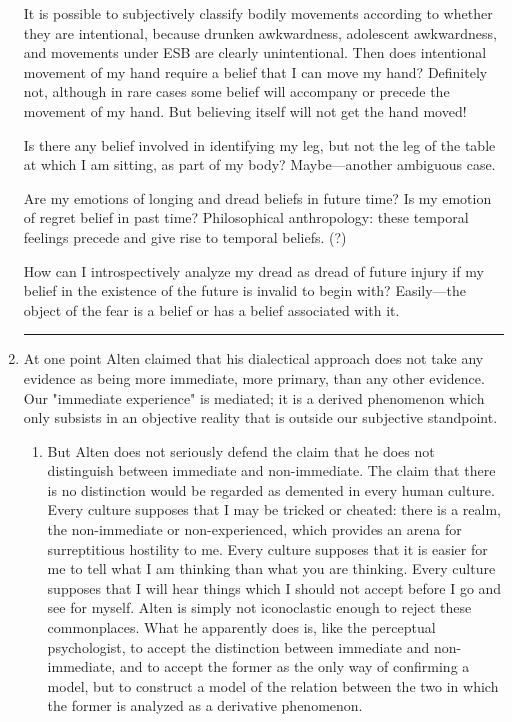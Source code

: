 \documentclass[10pt,twoside]{memoir}
\newcommand{\gap}{\plainbreak{2}}
\begin{document}
\begin{enumerate}
It is possible to subjectively classify bodily movements according to 
whether they are intentional, because drunken awkwardness, adolescent 
awkwardness, and movements under ESB are clearly unintentional. Then 
does intentional movement of my hand require a belief that I can move my 
hand? Definitely not, although in rare cases some belief will accompany or 
precede the movement of my hand. But believing itself will not get the hand 
moved! 

Is there any belief involved in identifying my leg, but not the leg of the 
table at which I am sitting, as part of my body? Maybe---another ambiguous 
case.

Are my emotions of longing and dread beliefs in future time? Is my 
emotion of regret belief in past time? Philosophical anthropology: these 
temporal feelings precede and give rise to temporal beliefs. (?) 

How can I introspectively analyze my dread as dread of future injury if 
my belief in the existence of the future is invalid to begin with? Easily---the 
object of the fear is a belief or has a belief associated with it. 

\gap

\item At one point Alten claimed that his dialectical approach does not 
take any evidence as being more immediate, more primary, than any other 
evidence. Our "immediate experience" is mediated; it is a derived 
phenomenon which only subsists in an objective reality that is outside our 
subjective standpoint. 

\begin{enumerate}

\item But Alten does not seriously defend the claim that he does not 
distinguish between immediate and non-immediate. The claim that there is 
no distinction would be regarded as demented in every human culture. Every 
culture supposes that I may be tricked or cheated: there is a realm, the 
non-immediate or non-experienced, which provides an arena for surreptitious 
hostility to me. Every culture supposes that it is easier for me to tell what I 
am thinking than what you are thinking. Every culture supposes that I will 
hear things which I should not accept before I go and see for myself. Alten is 
simply not iconoclastic enough to reject these commonplaces. What he 
apparently does is, like the perceptual psychologist, to accept the distinction 
between immediate and non-immediate, and to accept the former as the only 
way of confirming a model, but to construct a model of the relation between 
the two in which the former is analyzed as a derivative phenomenon. 


\end{enumerate}
\end{enumerate}
\end{document}
